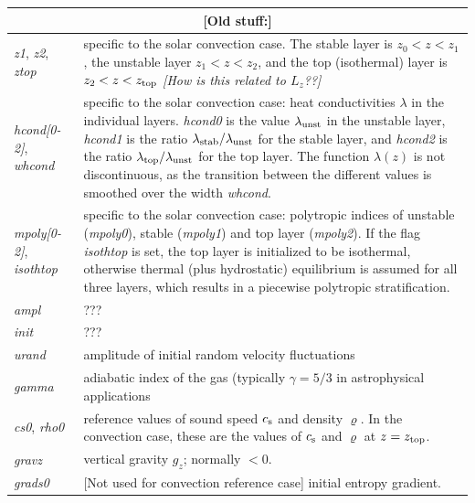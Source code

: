 \documentclass[12pt,twoside,notitlepage,a4paper]{article}
\makeatletter
\newcommand{\Note}[1]{\emph{[#1]}}
\newcommand{\var}[1]{\textsl{#1}\index{#1@\emph{#1}}\/}
\newcommand{\cs}            {c_{\rm s}}
\makeatother
\begin{document}
\begin{longtable}{lp{}}
\midrule
  \multicolumn{2}{c}{[Old stuff:]} \\
\midrule



  \var{z1}, \var{z2}, \var{ztop}
               & specific to the solar convection case.
                 The stable layer is $z_0 < z < z_1$, the unstable layer
                 $z_1 < z < z_2$, and the top (isothermal) layer is
                 $z_2 < z < z_{\rm top}$
                 \Note{How is this related to $L_z$??} \\
  \var{hcond[0-2]}, \var{whcond}
               & specific to the solar convection case: heat conductivities
                 $\lambda$ in the individual layers. \var{hcond0} is the
                 value $\lambda_{\rm unst}$ in the unstable layer,
                 \var{hcond1} is the ratio
                 $\lambda_{\rm stab}/\lambda_{\rm unst}$ for the stable
                 layer, and \var{hcond2} is the ratio 
                 $\lambda_{\rm top}/\lambda_{\rm unst}$ for the top layer.
                 The function $\lambda(z)$ is not discontinuous, as the
                 transition between the different values is smoothed over
                 the width \var{whcond}. \\
  \var{mpoly[0-2]}, \var{isothtop}
               & specific to the solar convection case: polytropic indices
                 of unstable (\var{mpoly0}), stable (\var{mpoly1}) and top
                 layer (\var{mpoly2}).
                 If the flag \var{isothtop} is set, the
                 top layer is initialized to be isothermal, otherwise
                 thermal (plus hydrostatic) equilibrium is assumed for all
                 three layers, which results in a piecewise polytropic
                 stratification. \\
  \var{ampl}   & ??? \\
  \var{init}   & ??? \\
  \var{urand}  & amplitude of initial random velocity fluctuations \\
  \var{gamma}  & adiabatic index of the gas (typically $\gamma=5/3$ in
                 astrophysical applications \\
  \var{cs0}, \var{rho0}
               & reference values of sound speed $\cs$ and density
                 $\varrho$. In the convection case, these are the values of
                 $\cs$ and $\varrho$ at $z=z_{\rm top}$. \\
  \var{gravz}  & vertical gravity $g_z$; normally $<0$. \\
  \var{grads0} & [Not used for convection reference case] initial entropy
                 gradient. \\
\bottomrule
\end{longtable}
\end{document}
